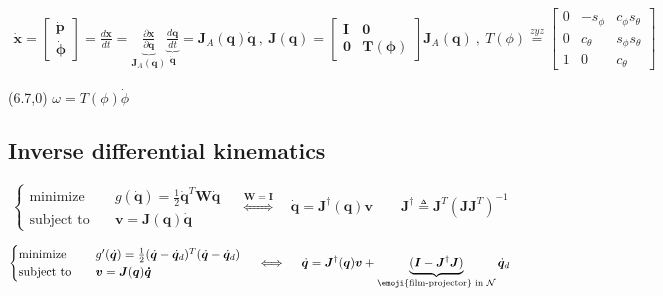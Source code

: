 \begin{gather*}
\dot{\bm{x}}
=
\begin{bmatrix} \dot{\bm{p}} \\ \dot{\bm{\phi}}\end{bmatrix}
=
\frac{d\bm{x}}{dt}
=
\underbrace{\frac{\partial\bm{x}}{\partial \bm{q}}}_{\bm{J}_A(\bm{q})}
\underbrace{\frac{d\bm{q}}{d t}}_{\dot{\bm{q}}}
=
\bm{J}_A(\bm{q})\dot{\bm{q}}
\ , \
\bm{J}(\bm{q})
=
\begin{bmatrix}
	\bm{I} & \bm{0} \\
	\bm{0} & \bm{T}(\bm{\phi})
\end{bmatrix}
\bm{J}_A(\bm{q})
\ , \
T(\phi)
\overset{zyz}{=}
\begin{bmatrix}
	0 & -s_\phi & c_\phi s_\theta \\
	0 & c_\theta & s_\phi s_\theta \\
	1 & 0 & c_\theta
\end{bmatrix}
\end{gather*}

\begin{textblock}{5}(6.7,0)
	$\omega = T(\phi) \dot{\phi}$
\end{textblock}


\vspace*{-5pt}
\subsection{Inverse differential kinematics}
\begin{equation*}
\begin{cases}
\text{minimize} & \quad g(\dot{\bm{q}}) = \frac{1}{2} \dot{\bm{q}}^T \bm{W} \dot{\bm{q}} \\
\text{subject to} & \quad \bm{v} = \bm{J}(\bm{q})\bm{\dot{q}}
\end{cases}
\quad 
\overset{\bm{W} = \bm{I}}{\iff}
\quad
\dot{\bm{q}} = \bm{J}^{\dagger}(\bm{q})\bm{v}
\qquad
\bm{J}^{\dagger} \triangleq \bm{J}^T(\bm{J}\bm{J}^T)^{-1}
\end{equation*}

\vspace{10pt}

\begin{equation*}
\begin{cases}
	\text{minimize} & \quad 
	g'(\dot{\bm{q}}) = \frac{1}{2} ( \dot{\bm{q}} - \dot{\bm{q}}_d )^T ( \dot{\bm{q}} - \dot{\bm{q}}_d ) \\
	\text{subject to} & \quad \bm{v} = \bm{J}(\bm{q})\bm{\dot{q}}
\end{cases}
\quad 
\iff
\quad
\dot{\bm{q}} = \bm{J}^{\dagger}(\bm{q})\bm{v}
+
\underbrace{(\bm{I} - \bm{J}^\dagger\bm{J})}_{\text{\emoji{film-projector} in }\mathcal{N}}
\dot{\bm{q}}_d
\end{equation*}

